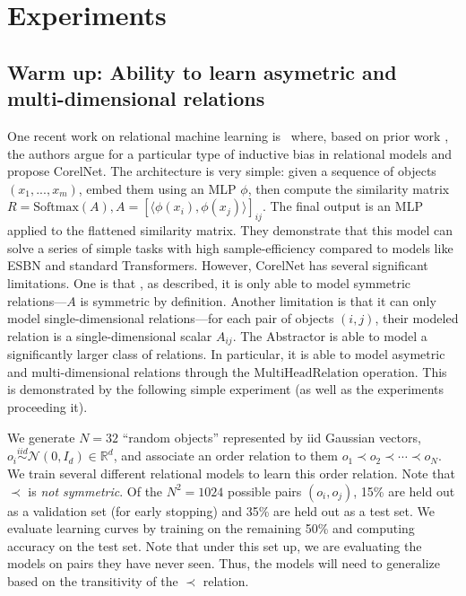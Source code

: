 
\section{Experiments}\label{sec:experiments}

\subsection{Warm up: Ability to learn asymetric and multi-dimensional relations}
One recent work on relational machine learning is~\cite{kerg2022neural} where, based on prior work \cite{esbn}, the
authors argue for a particular type of inductive bias in relational models and propose CorelNet. The architecture is very simple: given a sequence of objects $(x_1, ..., x_m)$, embed them using an MLP $\phi$, then compute the similarity matrix $R = \text{Softmax}(A), A = \left[\langle\phi(x_i), \phi(x_j)\rangle\right]_{ij}$. The final output is an MLP applied to the flattened similarity matrix. They demonstrate that this model can solve a series of simple tasks with high sample-efficiency compared to models like ESBN and standard Transformers. However, CorelNet has several significant limitations.
One is that
, as described,
it is only able to model symmetric relations---$A$ is symmetric by definition.
Another limitation is that it can only model single-dimensional relations---for each pair of objects $(i,j)$, their modeled relation is a single-dimensional scalar $A_{ij}$. The Abstractor is able to model a significantly larger class of relations. In particular, it is able to model asymetric and multi-dimensional relations through the $\text{MultiHeadRelation}$ operation. This is demonstrated by the following simple experiment (as well as the experiments proceeding it).

We generate $N = 32$ ``random objects'' represented by iid Gaussian vectors, $o_i \overset{iid}{\sim} \mathcal{N}(0,
I_d) \in \mathbb{R}^d$, and associate an order relation to them $o_1 \prec o_2 \prec \cdots \prec o_N$. We train
several different relational models to learn this order relation. Note that $\prec$ is \textit{not symmetric}. Of the $N^2 = 1024$ possible pairs $(o_i, o_j)$, 15\% are held out as a validation set (for early stopping) and 35\% are held out as a test set. We evaluate learning curves by training on the remaining 50\% and computing accuracy on the test set. Note that under this set up, we are evaluating the models on pairs they have never seen. Thus, the models will need to generalize based on the transitivity of the $\prec$ relation.

